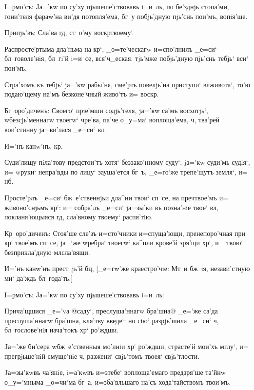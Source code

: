 I=рмо'съ: Jа='кw по су'ху пjьшеше'ствовавъ i=и~ль, по 
бе'зднjь стопа'ми, гони'теля фараw'на ви'дя потопля'ема, 
бг~у побjь'дную пjь'снь пои'мъ, вопiя'ше.

Припjь'въ: Сла'ва гд, ст~о'му воскр твоему`. 

Распросте'ртыма дла'ньма на кр`, _о=те'ческагw 
и=спо'лнилъ _е=си` бл~говоле'нiя, бл~гi'й i=и~се, 
вся'ч_еская. тjь'мже побjь'дную пjь'снь тебjь` вси` 
пои'мъ. 

Стра'хомъ къ тебjь` jа='кw рабы'ня, сме'рть повелjь'на 
приступи` вл живота`, то'ю подаю'щему на'мъ 
безконе'чный живо'тъ и= воскр.

Бг~оро'диченъ: Своего` прiе'мши содjь'теля, jа='кw 
са'мъ восхотjь`, w\т безсjь'меннагw твоегw` чре'ва, па'че 
о_у=ма` воплоща'ема, ч, тва'рей вои'стинну 
jа=ви'лася _е=си` вл.

И='нъ канw'нъ, кр.


Суди'лищу пiла'тову предстои'тъ хотя` беззако'нному 
суду`, jа='кw суди'мь судiя`, и= w\т руки` непра'вды по 
лицу` зауша'ется бг~ъ, _е=го'же трепе'щутъ земля`, и= 
нб.

Просте'рлъ _е=си` бж~е'ственнjьи дла^ни твои` сп~се, 
на преч твое'мъ и= живоно'снjьмъ кр`: и= 
собра'лъ _е=си` jа=зы'ки въ позна'нiе твое` вл, 
покланя'ющыяся гд, сла'вному твоему` распя'тiю.

Кр~оро'диченъ: Стоя'ше сле'зъ и=сто'чники 
и=спуща'ющи, пренепоро'чная при кр` твое'мъ сп~се, 
jа=`же w\т ребра` твоегw` ка^пли крове'й зря'щи хр`, 
и= твою` безприкла'дную мл сла'вящи.

И='нъ канw'нъ прест~jь'й бц, [_е=гw'же 
краестро'чiе: Мт~и бж~iя, незави'стную ми` да'ждь 
бл~года'ть.]

I=рмо'съ: Jа='кw по су'ху пjьшеше'ствовавъ i=и~ль:

Прича'щшися _е='vа @саду`, преслуша'ннагw бра'шна@ 
{_е='же са'да преслуша'ннагw бра'шна}, кля'тву введе`: но 
сiю` разрjь'шила _е=си` ч, бл~гослове'нiя нача'токъ 
хр` ро'ждши.

Jа='же би'сера w\т бж~е'ственныя мо'лнiи хр` 
ро'ждши, страсте'й мои'хъ мглу`, и= прегрjьше'нiй 
смуще'нiе ч, разжени` свjь'томъ твоея` свjь'тлости.

Jа=зы'кwвъ ча'янiе, i=а'кwвъ и=з\ъ тебе` воплоща'емаго 
предзря'ше та'йнw о_у='мныма _о=чи'ма бг~а, и=зба'вльшаго 
на'съ хода'тайствомъ твои'мъ. 

